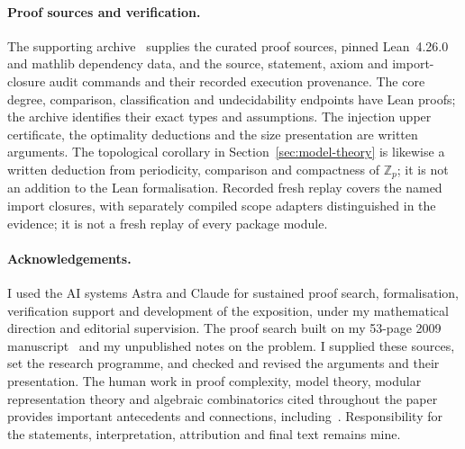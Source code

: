 \paragraph{Proof sources and verification.}
The supporting archive~\cite{RiisSupporting} supplies the
curated proof sources, pinned Lean~4.26.0 and mathlib dependency data,
and the source, statement, axiom and import-closure audit commands
and their recorded execution provenance. The core degree, comparison,
classification and undecidability endpoints have Lean proofs; the
archive identifies their exact types and assumptions. The injection
upper certificate, the optimality deductions and the size presentation
are written arguments. The topological corollary in
Section~\ref{sec:model-theory} is likewise a written deduction from
periodicity, comparison and compactness of $\mathbb Z_p$; it is not
an addition to the Lean formalisation. Recorded fresh replay covers the named import
closures, with separately compiled scope adapters distinguished in the
evidence; it is not a fresh replay of every package module.

\paragraph{Acknowledgements.}
I used the AI systems Astra and Claude for sustained proof search,
formalisation, verification support and development of the exposition,
under my mathematical direction and editorial supervision. The proof
search built on my 53-page 2009 manuscript~\cite{RiisLong} and my
unpublished notes on the problem. I supplied these sources, set the
research programme, and checked and revised the arguments and their
presentation. The human work in proof complexity,
model theory, modular representation theory and algebraic combinatorics
cited throughout the paper provides important antecedents and connections,
including~\cite{NSFoundations,PCFoundations,Ajtai,Krajicek,KrajEuler,
BussDesign,BeameRiis,RiisSitharamTautologies,RiisSitharamModules,
CEF,Harman,HKPSYZ,BDM}. Responsibility
for the statements, interpretation, attribution and final text remains mine.
